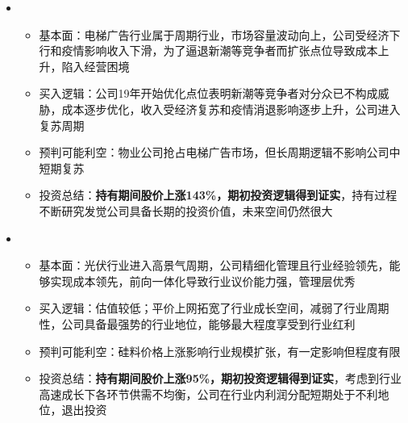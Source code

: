 \begin{itemize}[leftmargin=*]
{      }
    \item
      {\small
      \begin{itemize}
        \item 基本面：电梯广告行业属于周期行业，市场容量波动向上，公司受经济下行和疫情影响收入下滑，为了逼退新潮等竞争者而扩张点位导致成本上升，陷入经营困境
        \item 买入逻辑：公司19年开始优化点位表明新潮等竞争者对分众已不构成威胁，成本逐步优化，收入受经济复苏和疫情消退影响逐步上升，公司进入复苏周期
        \item 预判可能利空：物业公司抢占电梯广告市场，但长周期逻辑不影响公司中短期复苏
        \item 投资总结：\textbf{持有期间股价上涨143\%，期初投资逻辑得到证实}，持有过程不断研究发觉公司具备长期的投资价值，未来空间仍然很大
      \end{itemize}
      }
      \item
      {\small
      \begin{itemize}
        \item 基本面：光伏行业进入高景气周期，公司精细化管理且行业经验领先，能够实现成本领先，前向一体化导致行业议价能力强，管理层优秀
        \item 买入逻辑：估值较低；平价上网拓宽了行业成长空间，减弱了行业周期性，公司具备最强势的行业地位，能够最大程度享受到行业红利
        \item 预判可能利空：硅料价格上涨影响行业规模扩张，有一定影响但程度有限
        \item 投资总结：\textbf{持有期间股价上涨95\%，期初投资逻辑得到证实}，考虑到行业高速成长下各环节供需不均衡，公司在行业内利润分配短期处于不利地位，退出投资
      \end{itemize}
      }
  \end{itemize}